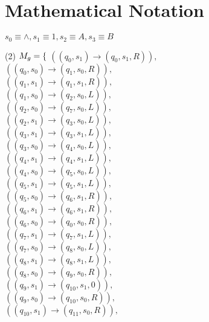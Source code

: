 \documentclass{article} %
\begin{document}
        \section{Mathematical Notation}
        $s_0 \equiv \land, s_1 \equiv 1, s_2 \equiv A, s_3 \equiv B$\\
        \begin{center}
            \begin{varwidth}{\textwidth}
            \begin{tasks}[label={},label-width={1cm}] (2)
                \task
                $M_g = \{\\$
            $((q_{0}, s_{1}) \to ( q_{0}, s_{1}, R)),$\\
            $((q_{0}, s_{0}) \to ( q_{1}, s_{0}, R)),$\\
            $((q_{1}, s_{1}) \to ( q_{1}, s_{1}, R)),$\\
            $((q_{1}, s_{0}) \to ( q_{2}, s_{0}, L)),$\\
            $((q_{2}, s_{0}) \to ( q_{7}, s_{0}, L)),$\\
            $((q_{2}, s_{1}) \to ( q_{3}, s_{0}, L)),$\\
            $((q_{3}, s_{1}) \to ( q_{3}, s_{1}, L)),$\\
            $((q_{3}, s_{0}) \to ( q_{4}, s_{0}, L)),$\\
            $((q_{4}, s_{1}) \to ( q_{4}, s_{1}, L)),$\\
            $((q_{4}, s_{0}) \to ( q_{5}, s_{0}, L)),$\\
            $((q_{5}, s_{1}) \to ( q_{5}, s_{1}, L)),$\\
            $((q_{5}, s_{0}) \to ( q_{6}, s_{1}, R)),$\\
            $((q_{6}, s_{1}) \to ( q_{6}, s_{1}, R)),$\\
            $((q_{6}, s_{0}) \to ( q_{0}, s_{0}, R)),$\\
            $((q_{7}, s_{1}) \to ( q_{7}, s_{1}, L)),$\\
            $((q_{7}, s_{0}) \to ( q_{8}, s_{0}, L)),$\\
            $((q_{8}, s_{1}) \to ( q_{8}, s_{1}, L)),$\\
            $((q_{8}, s_{0}) \to ( q_{9}, s_{0}, R)),$\\
            $((q_{9}, s_{1}) \to ( q_{10}, s_{1}, 0)),$\\
            $((q_{9}, s_{0}) \to ( q_{10}, s_{0}, R)),$\\
            $((q_{10}, s_{1}) \to ( q_{11}, s_{0}, R)),$\\

\end{tasks}
\end{varwidth}
\end{center}
\end{document}
